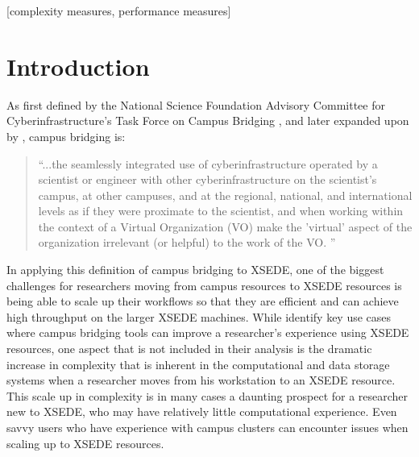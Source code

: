 \documentclass{sig-alternate}
\begin{document}
[complexity measures, performance measures]



\section{Introduction}
As first defined by the National Science Foundation Advisory Committee for Cyberinfrastructure's Task Force on Campus Bridging \cite{nsf2011}, and later expanded upon by \citeauthor{stewart2012}, campus bridging is:

\begin{quotation}
``...the seamlessly integrated use of cyberinfrastructure operated by a scientist or engineer
with other cyberinfrastructure on the scientist's campus, at other campuses, and at the regional, national,
and international levels as if they were proximate to the scientist, and when working within the context of a
Virtual Organization (VO) make the 'virtual' aspect of the organization irrelevant (or helpful) to the work of
the VO. \cite{stewart2012}''
\end{quotation}

In applying this definition of campus bridging to XSEDE, one of the biggest challenges for researchers moving
from campus resources to XSEDE resources is being able to scale up their workflows so that they are efficient
and can achieve high throughput on the larger XSEDE machines. While \citeauthor{stewart2012} identify key use
cases where campus bridging tools can improve a researcher's experience using XSEDE resources, one aspect that
is not included in their analysis is the dramatic increase in complexity that is inherent in the computational
and data storage systems when a researcher moves from his workstation to an XSEDE resource. This scale up in
complexity is in many cases a daunting prospect for a researcher new to XSEDE, who may have relatively little
computational experience. Even savvy users who have experience with campus clusters can encounter issues when
scaling up to XSEDE resources.
\end{document}

